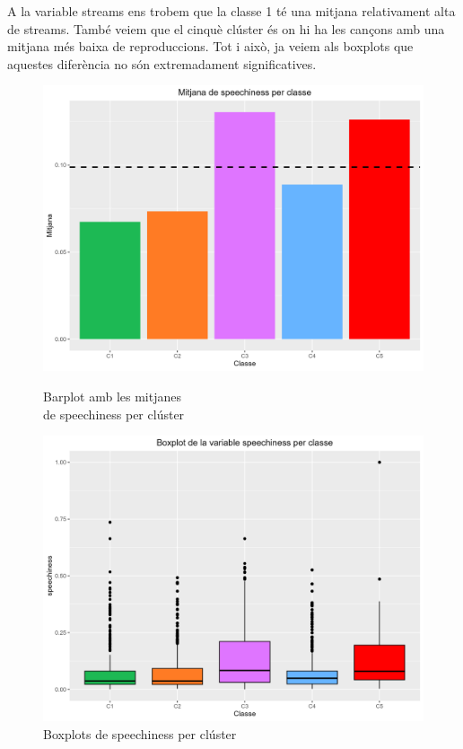 A la variable streams ens trobem que la classe 1 té una mitjana relativament alta de streams. També veiem que el cinquè clúster és on hi ha les cançons amb una mitjana més baixa de reproduccions. Tot i això, ja veiem als boxplots que aquestes diferència no són extremadament significatives. 

\begin{figure}[H]
\centering
    \begin{minipage}{.49\textwidth}
        \centering
        \includegraphics[width=0.95\linewidth]{Images/5_Profiling/numeriques/Num_BarPlot_speechiness.png}
        \caption{Barplot amb les mitjanes \\ de speechiness per clúster}
        \label{fig:Num_BarPlot_speechiness}
    \end{minipage}%
    \begin{minipage}{.49\textwidth}
        \centering
        \includegraphics[width=0.95\linewidth]{Images/5_Profiling/numeriques/Num_BoxPlot_speechiness.png}
        \caption{Boxplots de speechiness per clúster}
        \label{fig:Num_BoxPlot_speechiness}
    \end{minipage}%
\end{figure}

